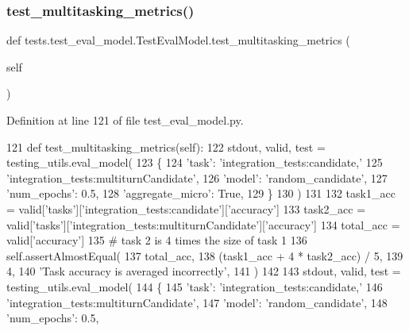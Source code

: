 \subsubsection{\texorpdfstring{test\+\_\+multitasking\+\_\+metrics()}{test\_multitasking\_metrics()}}
{\footnotesize\ttfamily def tests.\+test\+\_\+eval\+\_\+model.\+Test\+Eval\+Model.\+test\+\_\+multitasking\+\_\+metrics (\begin{DoxyParamCaption}\item[{}]{self }\end{DoxyParamCaption})}



Definition at line 121 of file test\+\_\+eval\+\_\+model.\+py.


\begin{DoxyCode}
121     \textcolor{keyword}{def }test\_multitasking\_metrics(self):
122         stdout, valid, test = testing\_utils.eval\_model(
123             \{
124                 \textcolor{stringliteral}{'task'}: \textcolor{stringliteral}{'integration\_tests:candidate,'}
125                 \textcolor{stringliteral}{'integration\_tests:multiturnCandidate'},
126                 \textcolor{stringliteral}{'model'}: \textcolor{stringliteral}{'random\_candidate'},
127                 \textcolor{stringliteral}{'num\_epochs'}: 0.5,
128                 \textcolor{stringliteral}{'aggregate\_micro'}: \textcolor{keyword}{True},
129             \}
130         )
131 
132         task1\_acc = valid[\textcolor{stringliteral}{'tasks'}][\textcolor{stringliteral}{'integration\_tests:candidate'}][\textcolor{stringliteral}{'accuracy'}]
133         task2\_acc = valid[\textcolor{stringliteral}{'tasks'}][\textcolor{stringliteral}{'integration\_tests:multiturnCandidate'}][\textcolor{stringliteral}{'accuracy'}]
134         total\_acc = valid[\textcolor{stringliteral}{'accuracy'}]
135         \textcolor{comment}{# task 2 is 4 times the size of task 1}
136         self.assertAlmostEqual(
137             total\_acc,
138             (task1\_acc + 4 * task2\_acc) / 5,
139             4,
140             \textcolor{stringliteral}{'Task accuracy is averaged incorrectly'},
141         )
142 
143         stdout, valid, test = testing\_utils.eval\_model(
144             \{
145                 \textcolor{stringliteral}{'task'}: \textcolor{stringliteral}{'integration\_tests:candidate,'}
146                 \textcolor{stringliteral}{'integration\_tests:multiturnCandidate'},
147                 \textcolor{stringliteral}{'model'}: \textcolor{stringliteral}{'random\_candidate'},
148                 \textcolor{stringliteral}{'num\_epochs'}: 0.5,

\end{DoxyCode}
